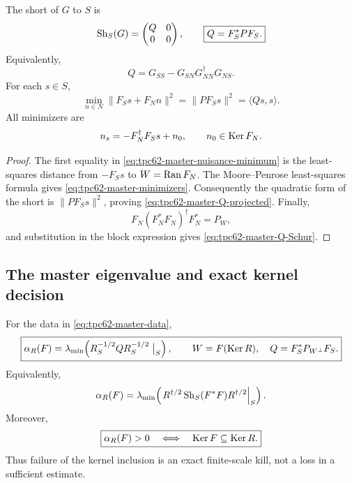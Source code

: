\begin{lemma}
\label{lem:tpc62-projected-Gram}
The short of \(G\) to \(S\) is
\begin{equation}
 \operatorname{Sh}_S(G)
 =\begin{pmatrix}Q&0\\0&0\end{pmatrix},
 \qquad
 \boxed{Q=F_S^*PF_S.}
 \label{eq:tpc62-master-Q-projected}
\end{equation}
Equivalently,
\begin{equation}
 Q
 =G_{SS}-G_{SN}G_{NN}^{\dagger}G_{NS}.
 \label{eq:tpc62-master-Q-Schur}
\end{equation}
For each \(s\in S\),
\begin{equation}
 \min_{n\in N}\|F_Ss+F_Nn\|^2
 =\|PF_Ss\|^2
 =\langle Qs,s\rangle.
 \label{eq:tpc62-master-nuisance-minimum}
\end{equation}
All minimizers are
\begin{equation}
 n_s=-F_N^\dagger F_Ss+n_0,
 \qquad n_0\in\operatorname{Ker} F_N.
 \label{eq:tpc62-master-minimizers}
\end{equation}
\end{lemma}

\begin{proof}
The first equality in \eqref{eq:tpc62-master-nuisance-minimum} is the
least-squares distance from \(-F_Ss\) to
\(W=\operatorname{Ran} F_N\).  The Moore--Penrose least-squares formula gives
\eqref{eq:tpc62-master-minimizers}.  Consequently the quadratic form of
the short is \(\|PF_Ss\|^2\), proving
\eqref{eq:tpc62-master-Q-projected}.  Finally,
\[
 F_N(F_N^*F_N)^\dagger F_N^*=P_W,
\]
and substitution in the block expression gives
\eqref{eq:tpc62-master-Q-Schur}.
\end{proof}

\subsection{The master eigenvalue and exact kernel decision}

\begin{theorem}
\label{thm:tpc62-master-shorted-gram}
For the data in \eqref{eq:tpc62-master-data},
\begin{equation}
 \boxed{
 \alpha_R(F)
 =\lambda_{\min}\!\left(
 R_S^{-1/2}QR_S^{-1/2}\bigm|_S
 \right),
 \qquad W=F(\operatorname{Ker} R),\quad Q=F_S^*P_{W^\perp}F_S.}
 \label{eq:tpc62-master-eigenvalue}
\end{equation}
Equivalently,
\begin{equation}
 \alpha_R(F)
 =\lambda_{\min}\!\left(
 \left.
 R^{\dagger/2}\operatorname{Sh}_S(F^*F)R^{\dagger/2}
 \right|_S
 \right).
 \label{eq:tpc62-master-global-eigenvalue}
\end{equation}
Moreover,
\begin{equation}
 \boxed{
 \alpha_R(F)>0
 \quad\Longleftrightarrow\quad
 \operatorname{Ker} F\subseteq\operatorname{Ker} R.}
 \label{eq:tpc62-master-kernel-equivalence}
\end{equation}
Thus failure of the kernel inclusion is an exact finite-scale kill, not a
loss in a sufficient estimate.
\end{theorem}


